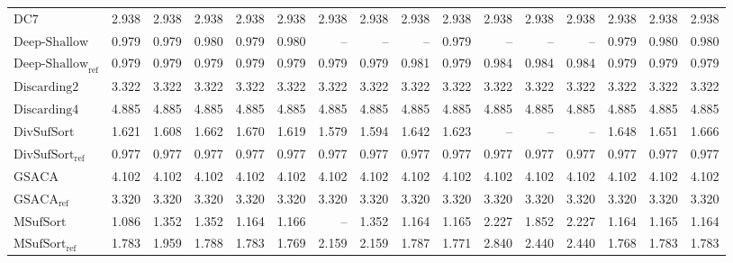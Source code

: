 \begin{table}
{\begin{tabular}{lrrrrrrrrrrrrrrr}
    $\text{DC7}$ & 2.938 & 2.938 & 2.938 & 2.938 & 2.938 & 2.938 & 2.938 & 2.938 & 2.938 & 2.938 & 2.938 & 2.938 & 2.938 & 2.938 & 2.938 \\
    $\text{Deep-Shallow}$ & 0.979 & 0.979 & 0.980 & 0.979 & 0.980 & {\color{darkgray}--} & {\color{darkgray}--} & {\color{darkgray}--} & 0.979 & {\color{darkgray}--} & {\color{darkgray}--} & {\color{darkgray}--} & 0.979 & 0.980 & 0.980 \\
    $\text{Deep-Shallow}_{\text{ref}}$ & 0.979 & 0.979 & 0.979 & 0.979 & 0.979 & 0.979 & 0.979 & 0.981 & 0.979 & 0.984 & 0.984 & 0.984 & 0.979 & 0.979 & 0.979 \\
    $\text{Discarding2}$ & 3.322 & 3.322 & 3.322 & 3.322 & 3.322 & 3.322 & 3.322 & 3.322 & 3.322 & 3.322 & 3.322 & 3.322 & 3.322 & 3.322 & 3.322 \\
    $\text{Discarding4}$ & {\color{red}4.885} & {\color{red}4.885} & {\color{red}4.885} & {\color{red}4.885} & {\color{red}4.885} & {\color{red}4.885} & {\color{red}4.885} & {\color{red}4.885} & {\color{red}4.885} & {\color{red}4.885} & {\color{red}4.885} & {\color{red}4.885} & {\color{red}4.885} & {\color{red}4.885} & {\color{red}4.885} \\
    $\text{DivSufSort}$ & 1.621 & 1.608 & 1.662 & 1.670 & 1.619 & 1.579 & 1.594 & 1.642 & 1.623 & {\color{darkgray}--} & {\color{darkgray}--} & {\color{darkgray}--} & 1.648 & 1.651 & 1.666 \\
    $\text{DivSufSort}_{\text{ref}}$ & 0.977 & 0.977 & {\color{green!60!black}0.977} & {\color{green!60!black}0.977} & {\color{green!60!black}0.977} & {\color{green!60!black}0.977} & {\color{green!60!black}0.977} & {\color{green!60!black}0.977} & {\color{green!60!black}0.977} & {\color{green!60!black}0.977} & {\color{green!60!black}0.977} & {\color{green!60!black}0.977} & {\color{green!60!black}0.977} & {\color{green!60!black}0.977} & {\color{green!60!black}0.977} \\
    $\text{GSACA}$ & 4.102 & 4.102 & 4.102 & 4.102 & 4.102 & 4.102 & 4.102 & 4.102 & 4.102 & 4.102 & 4.102 & 4.102 & 4.102 & 4.102 & 4.102 \\
    $\text{GSACA}_{\text{ref}}$ & 3.320 & 3.320 & 3.320 & 3.320 & 3.320 & 3.320 & 3.320 & 3.320 & 3.320 & 3.320 & 3.320 & 3.320 & 3.320 & 3.320 & 3.320 \\
    $\text{MSufSort}$ & 1.086 & 1.352 & 1.352 & 1.164 & 1.166 & {\color{darkgray}--} & 1.352 & 1.164 & 1.165 & 2.227 & 1.852 & 2.227 & 1.164 & 1.165 & 1.164 \\
    $\text{MSufSort}_{\text{ref}}$ & 1.783 & 1.959 & 1.788 & 1.783 & 1.769 & 2.159 & 2.159 & 1.787 & 1.771 & 2.840 & 2.440 & 2.440 & 1.768 & 1.783 & 1.783 \\

\end{tabular}}
\end{table}
